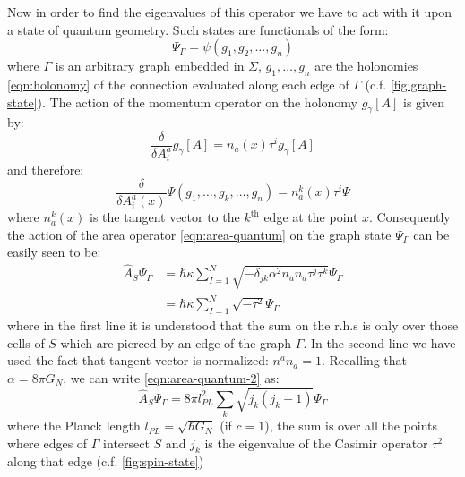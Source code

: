 \documentclass{ws-mpla}
\begin{document}
Now in order to find the eigenvalues of this operator we have to act with it upon a state of quantum geometry. Such states are functionals of the form:
\begin{equation}\label{eqn:graph-state}
	\Psi_\Gamma = \psi(g_1,g_2,\ldots,g_n)
\end{equation}
where $ \Gamma $ is an arbitrary graph embedded in $ \Sigma $, $ g_1,\ldots,g_n $ are the holonomies \eqref{eqn:holonomy} of the connection evaluated along each edge of $ \Gamma $ (c.f. \autoref{fig:graph-state}). The action of the momentum operator on the holonomy $ g_\gamma[A] $ is given by:
\begin{equation}\label{eqn:edge-momentum}
	\frac{\delta}{\delta A^a_i} g_\gamma[A] = n_a (x) \tau^i g_\gamma[A]
\end{equation}
and therefore:
\begin{equation}\label{eqn:graph-momentum}
	\frac{\delta}{\delta A^a_i(x)} \Psi(g_1,\ldots,g_k,\ldots,g_n) = n_a^k(x) \tau^i \Psi
\end{equation}
where $ n_a^k(x) $ is the tangent vector to the $ k^\text{th} $ edge at the point $ x $. Consequently the action of the area operator \eqref{eqn:area-quantum} on the graph state $ \Psi_\Gamma $ can be easily seen to be:
\begin{align}\label{eqn:area-quantum-2}
	\hat A_S \Psi_\Gamma & = \hbar \kappa \sum_{I=1}^N \sqrt{-\delta_{jk} \alpha^2 n_a n_a \tau^j \tau^k } \Psi_\Gamma \nonumber \\
	& = \hbar \kappa \sum_{I=1}^N \sqrt{- \tau^2} \Psi_\Gamma
\end{align}
where in the first line it is understood that the sum on the r.h.s is only over those cells of $ S $ which are pierced by an edge of the graph $ \Gamma $. In the second line we have used the fact that tangent vector is normalized: $ n^a n_a = 1 $. Recalling that $ \alpha = 8 \pi G_N $, we can write \eqref{eqn:area-quantum-2} as:
\begin{equation}\label{eqn:area-quantum-3}
	\hat A_S \Psi_\Gamma = 8 \pi l_{PL}^2 \sum_k \sqrt{ j_k (j_k + 1)} \Psi_\Gamma
\end{equation}
where the Planck length $ l_{PL} = \sqrt{\hbar G_N} $ (if $ c = 1 $), the sum is over all the points where edges of $ \Gamma $ intersect $ S $ and $ j_k $ is the eigenvalue of the Casimir operator $ \tau^2 $ along that edge (c.f. \autoref{fig:spin-state})
\end{document}
